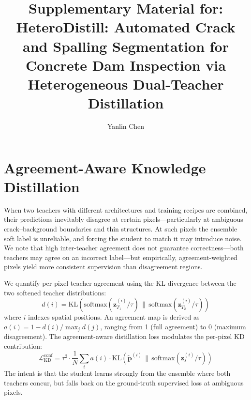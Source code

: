 \documentclass[review,authoryear]{elsarticle}
\begin{document}
\begin{frontmatter}
\title{Supplementary Material for: HeteroDistill: Automated Crack and Spalling Segmentation for Concrete Dam Inspection via Heterogeneous Dual-Teacher Distillation}
\author[inst1]{Yanlin Chen}
\address[inst1]{College of Graduate and Professional Studies, Trine University, Angola, IN 46703, USA}
\end{frontmatter}

\setcounter{section}{0}
\renewcommand{\thesection}{S\arabic{section}}
\renewcommand{\thetable}{S\arabic{table}}
\renewcommand{\thefigure}{S\arabic{figure}}
\renewcommand{\theequation}{S\arabic{equation}}

\section{Agreement-Aware Knowledge Distillation}
\label{sec:supp_agreement}

When two teachers with different architectures and training recipes are combined, their predictions inevitably disagree at certain pixels---particularly at ambiguous crack--background boundaries and thin structures. At such pixels the ensemble soft label is unreliable, and forcing the student to match it may introduce noise. We note that high inter-teacher agreement does not guarantee correctness---both teachers may agree on an incorrect label---but empirically, agreement-weighted pixels yield more consistent supervision than disagreement regions.

We quantify per-pixel teacher agreement using the KL divergence between the two softened teacher distributions:
\begin{equation}
    d(i) = \text{KL}\!\left(\text{softmax}(\mathbf{z}_{T_1}^{(i)} / \tau) \,\|\, \text{softmax}(\mathbf{z}_{T_2}^{(i)} / \tau)\right)
    \label{eq:supp_teacher_disagree}
\end{equation}
where $i$ indexes spatial positions. An agreement map is derived as $a(i) = 1 - d(i) / \max_j d(j)$, ranging from 1 (full agreement) to 0 (maximum disagreement). The agreement-aware distillation loss modulates the per-pixel KD contribution:
\begin{equation}
    \mathcal{L}_{\text{KD}}^{\text{conf}} = \tau^2 \cdot \frac{1}{N} \sum_{i} a(i) \cdot \text{KL}\!\left(\tilde{\mathbf{p}}^{(i)} \,\|\, \text{softmax}(\mathbf{z}_s^{(i)} / \tau)\right)
    \label{eq:supp_conf_kd}
\end{equation}
The intent is that the student learns strongly from the ensemble where both teachers concur, but falls back on the ground-truth supervised loss at ambiguous pixels.
\end{document}
